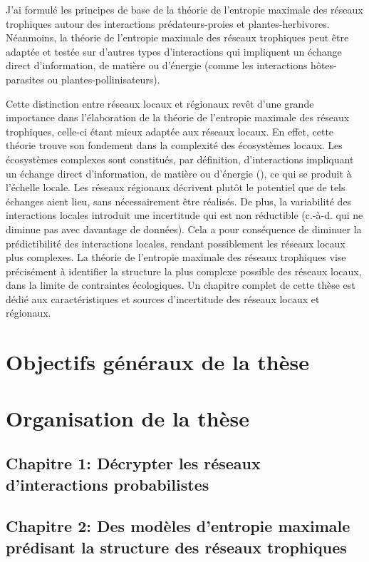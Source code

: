 J'ai formulé les principes de base de la théorie de l'entropie maximale des
réseaux trophiques autour des interactions prédateurs-proies et
plantes-herbivores. Néanmoins, la théorie de l'entropie maximale des réseaux
trophiques peut être adaptée et testée sur d'autres types d'interactions qui
impliquent un échange direct d'information, de matière ou d'énergie (comme les
interactions hôtes-parasites ou plantes-pollinisateurs).

Cette distinction entre réseaux locaux et régionaux revêt d'une grande
importance dans l'élaboration de la théorie de l'entropie maximale des réseaux
trophiques, celle-ci étant mieux adaptée aux réseaux locaux. En effet, cette
théorie trouve son fondement dans la complexité des écosystèmes locaux. Les
écosystèmes complexes sont constitués, par définition, d'interactions impliquant
un échange direct d'information, de matière ou d'énergie
(\cite{Ladyman2013What}), ce qui se produit à l'échelle locale. Les réseaux
régionaux décrivent plutôt le potentiel que de tels échanges aient lieu, sans
nécessairement être réalisés. De plus, la variabilité des interactions locales
introduit une incertitude qui est non réductible (c.-à-d. qui ne diminue pas
avec davantage de données). Cela a pour conséquence de diminuer la prédictibilité des
interactions locales, rendant possiblement les réseaux locaux plus complexes. La
théorie de l'entropie maximale des réseaux trophiques vise précisément à
identifier la structure la plus complexe possible des réseaux locaux, dans la
limite de contraintes écologiques. Un chapitre complet de cette thèse est dédié
aux caractéristiques et sources d'incertitude des réseaux locaux et régionaux.



\section{Objectifs généraux de la thèse} 



\section{Organisation de la thèse}

\subsection{Chapitre 1: Décrypter les réseaux d'interactions probabilistes} 

\subsection{Chapitre 2: Des modèles d'entropie maximale prédisant la structure des réseaux trophiques} 

\endinput
